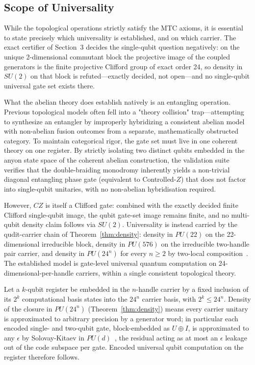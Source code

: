 \subsection{Scope of Universality}
While the topological operations strictly satisfy the MTC axioms, it is essential to state precisely which universality is established, and on which carrier. The exact certifier of Section~3 decides the single-qubit question negatively: on the unique 2-dimensional commutant block the projective image of the coupled generators is the finite projective Clifford group of exact order 24, so density in $SU(2)$ on that block is refuted---exactly decided, not open---and no single-qubit universal gate set exists there.

What the abelian theory does establish natively is an entangling operation. Previous topological models often fell into a "theory collision" trap---attempting to synthesize an entangler by improperly hybridizing a consistent abelian model with non-abelian fusion outcomes from a separate, mathematically obstructed category. To maintain categorical rigor, the gate set must live in one coherent theory on one register. By strictly isolating two distinct qubits embedded in the anyon state space of the coherent abelian construction, the validation suite verifies that the double-braiding monodromy inherently yields a non-trivial diagonal entangling phase gate (equivalent to Controlled-$Z$) that does not factor into single-qubit unitaries, with no non-abelian hybridisation required.

However, $CZ$ is itself a Clifford gate: combined with the exactly decided finite Clifford single-qubit image, the qubit gate-set image remains finite, and no multi-qubit density claim follows via $SU(2)$. Universality is instead carried by the qudit-carrier chain of Theorem~\ref{thm:density}: density in $PU(22)$ on the 22-dimensional irreducible block, density in $PU(576)$ on the irreducible two-handle pair carrier, and density in $PU(24^{n})$ for every $n \ge 2$ by two-local composition~\cite{brylinski2002}. The established model is gate-level universal quantum computation on 24-dimensional-per-handle carriers, within a single consistent topological theory.

\begin{corollary}
\label{cor:encoded}
Let a $k$-qubit register be embedded in the $n$-handle carrier by a fixed inclusion of its $2^k$ computational basis states into the $24^n$ carrier basis, with $2^k \le 24^n$. Density of the closure in $PU(24^n)$ (Theorem~\ref{thm:density}) means every carrier unitary is approximated to arbitrary precision by a generator word; in particular each encoded single- and two-qubit gate, block-embedded as $U\oplus I$, is approximated to any $\epsilon$ by Solovay-Kitaev in $PU(d)$~\cite{dawson2005}, the residual acting as at most an $\epsilon$ leakage out of the code subspace per gate. Encoded universal qubit computation on the register therefore follows.
\end{corollary}

